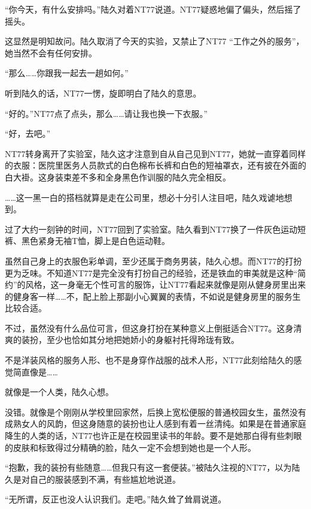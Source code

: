 “你今天，有什么安排吗。”陆久对着NT77说道。NT77疑惑地偏了偏头，然后摇了摇头。

这显然是明知故问。陆久取消了今天的实验，又禁止了NT77 “工作之外的服务”，她当然不会有任何安排。

“那么……你跟我一起去一趟如何。”

听到陆久的话，NT77一愣，旋即明白了陆久的意思。

“好的。”NT77点了点头，那么……请让我也换一下衣服。”

“好，去吧。”

NT77转身离开了实验室，陆久这才注意到自从自己见到NT77，她就一直穿着同样的衣服：医院里医务人员款式的白色棉布长裤和白色的短袖罩衣，还有披在外面的白大褂。这身装束差不多和全身黑色作训服的陆久完全相反。

……这一黑一白的搭档就算是走在公司里，想必十分引人注目吧，陆久戏谑地想到。

过了大约一刻钟的时间，NT77回到了实验室。陆久看到NT77换了一件灰色运动短裤、黑色紧身无袖T恤，脚上是白色运动鞋。

虽然自己身上的衣服色彩单调，至少还属于商务男装，陆久心想。而NT77的打扮更为乏味。不知道NT77是完全没有打扮自己的经验，还是铁血的审美就是这种“简约”的风格，这一身毫无个性可言的服饰，让NT77看起来就像是刚从健身房里出来的健身客一样……不，配上脸上那副小心翼翼的表情，不如说是健身房里的服务生比较合适。

不过，虽然没有什么品位可言，但这身打扮在某种意义上倒挺适合NT77。这身清爽的装扮，至少也恰如其分地把她娇小的身躯衬托得玲珑有致。

不是洋装风格的服务人形、也不是身穿作战服的战术人形，NT77此刻给陆久的感觉简直像是……

就像是一个人类，陆久心想。

没错。就像是个刚刚从学校里回家然，后换上宽松便服的普通校园女生，虽然没有成熟女人的风韵，但这身随意的装扮也让人感到有着一丝清纯。如果是在普通家庭降生的人类的话，NT77也许正是在校园里读书的年龄。要不是她那白得有些刺眼的皮肤和标致得过分精确的脸，陆久一定不会想到她也是一个人形。

“抱歉，我的装扮有些随意……但我只有这一套便装。”被陆久注视的NT77，以为陆久是对自己的服装感到不满，有些尴尬地说道。

“无所谓，反正也没人认识我们。走吧。”陆久耸了耸肩说道。